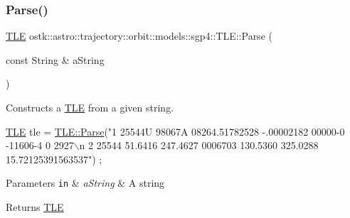 \subsubsection{\texorpdfstring{Parse()}{Parse()}}
{\footnotesize\ttfamily \hyperlink{classostk_1_1astro_1_1trajectory_1_1orbit_1_1models_1_1sgp4_1_1_t_l_e}{T\+LE} ostk\+::astro\+::trajectory\+::orbit\+::models\+::sgp4\+::\+T\+L\+E\+::\+Parse (\begin{DoxyParamCaption}\item[{const String \&}]{a\+String }\end{DoxyParamCaption})\hspace{0.3cm}{\ttfamily [static]}}



Constructs a \hyperlink{classostk_1_1astro_1_1trajectory_1_1orbit_1_1models_1_1sgp4_1_1_t_l_e}{T\+LE} from a given string. 


\begin{DoxyCode}
\hyperlink{classostk_1_1astro_1_1trajectory_1_1orbit_1_1models_1_1sgp4_1_1_t_l_e_a57323db2c24577c2e8ddce79fa776d1e}{TLE} tle = \hyperlink{classostk_1_1astro_1_1trajectory_1_1orbit_1_1models_1_1sgp4_1_1_t_l_e_a7f97a74af47895aa315aebc52f410d26}{TLE::Parse}(\textcolor{stringliteral}{"1 25544U 98067A   08264.51782528 -.00002182  00000-0 -11606-4 0  2927\(\backslash\)n}
\textcolor{stringliteral}{                      2 25544  51.6416 247.4627 0006703 130.5360 325.0288 15.72125391563537"}) ;
\end{DoxyCode}



\begin{DoxyParams}[1]{Parameters}
\mbox{\tt in}  & {\em a\+String} & A string \\
\hline
\end{DoxyParams}
\begin{DoxyReturn}{Returns}
\hyperlink{classostk_1_1astro_1_1trajectory_1_1orbit_1_1models_1_1sgp4_1_1_t_l_e}{T\+LE} 
\end{DoxyReturn}
\mbox{\label{classostk_1_1astro_1_1trajectory_1_1orbit_1_1models_1_1sgp4_1_1_t_l_e_a1b31551503d41d052b3270782824e489}} 
